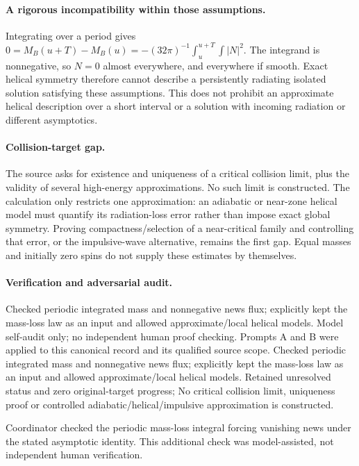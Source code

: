 \documentclass[11pt]{article}
\begin{document}
\paragraph{A rigorous incompatibility within those assumptions.} Integrating over a period gives $0=M_B(u+T)-M_B(u)=-(32\pi)^{-1}\int_u^{u+T}\int|N|^2$. The integrand is nonnegative, so $N=0$ almost everywhere, and everywhere if smooth. Exact helical symmetry therefore cannot describe a persistently radiating isolated solution satisfying these assumptions. This does not prohibit an approximate helical description over a short interval or a solution with incoming radiation or different asymptotics.

\paragraph{Collision-target gap.} The source asks for existence and uniqueness of a critical collision limit, plus the validity of several high-energy approximations. No such limit is constructed. The calculation only restricts one approximation: an adiabatic or near-zone helical model must quantify its radiation-loss error rather than impose exact global symmetry. Proving compactness/selection of a near-critical family and controlling that error, or the impulsive-wave alternative, remains the first gap. Equal masses and initially zero spins do not supply these estimates by themselves.

\paragraph{Verification and adversarial audit.}
Checked periodic integrated mass and nonnegative news flux; explicitly kept the mass-loss law as an input and allowed approximate/local helical models. Model self-audit only; no independent human proof checking. Prompts A and B were applied to this canonical record and its qualified source scope. Checked periodic integrated mass and nonnegative news flux; explicitly kept the mass-loss law as an input and allowed approximate/local helical models. Retained unresolved status and zero original-target progress; No critical collision limit, uniqueness proof or controlled adiabatic/helical/impulsive approximation is constructed.

Coordinator checked the periodic mass-loss integral forcing vanishing news under the stated asymptotic identity. This additional check was model-assisted, not independent human verification.
\end{document}

